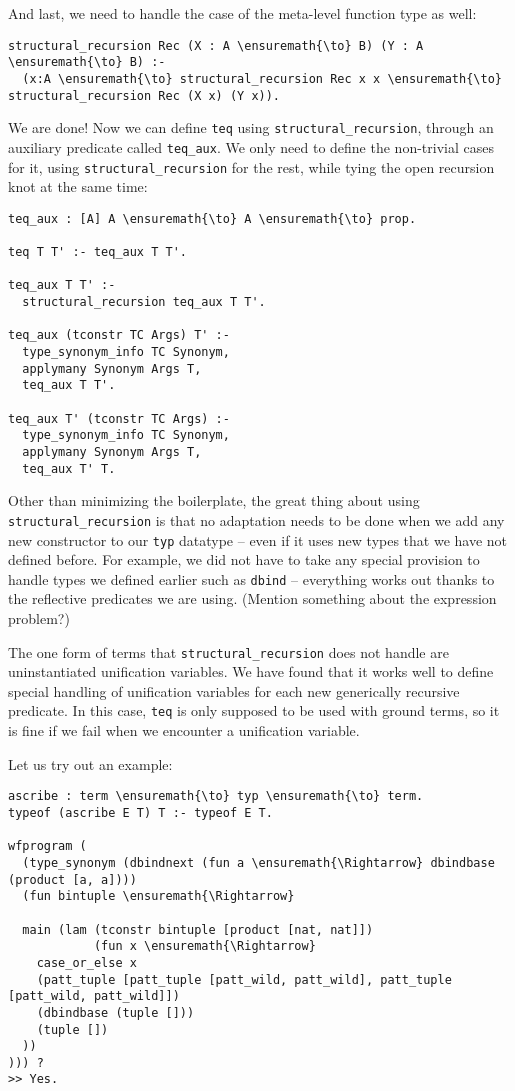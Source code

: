 And last, we need to handle the case of the meta-level function type as
well:

\begin{verbatim}
structural_recursion Rec (X : A \ensuremath{\to} B) (Y : A \ensuremath{\to} B) :-
  (x:A \ensuremath{\to} structural_recursion Rec x x \ensuremath{\to} structural_recursion Rec (X x) (Y x)).
\end{verbatim}

We are done! Now we can define \texttt{teq} using
\texttt{structural\_recursion}, through an auxiliary predicate called
\texttt{teq\_aux}. We only need to define the non-trivial cases for it,
using \texttt{structural\_recursion} for the rest, while tying the open
recursion knot at the same time:

\begin{verbatim}
teq_aux : [A] A \ensuremath{\to} A \ensuremath{\to} prop.

teq T T' :- teq_aux T T'.

teq_aux T T' :-
  structural_recursion teq_aux T T'.

teq_aux (tconstr TC Args) T' :-
  type_synonym_info TC Synonym,
  applymany Synonym Args T,
  teq_aux T T'.

teq_aux T' (tconstr TC Args) :-
  type_synonym_info TC Synonym,
  applymany Synonym Args T,
  teq_aux T' T.
\end{verbatim}

Other than minimizing the boilerplate, the great thing about using
\texttt{structural\_recursion} is that no adaptation needs to be done
when we add any new constructor to our \texttt{typ} datatype -- even if
it uses new types that we have not defined before. For example, we did
not have to take any special provision to handle types we defined
earlier such as \texttt{dbind} -- everything works out thanks to the
reflective predicates we are using. (Mention something about the
expression problem?)

The one form of terms that \texttt{structural\_recursion} does not
handle are uninstantiated unification variables. We have found that it
works well to define special handling of unification variables for each
new generically recursive predicate. In this case, \texttt{teq} is only
supposed to be used with ground terms, so it is fine if we fail when we
encounter a unification variable.

Let us try out an example:

\begin{verbatim}
ascribe : term \ensuremath{\to} typ \ensuremath{\to} term.
typeof (ascribe E T) T :- typeof E T.

wfprogram (
  (type_synonym (dbindnext (fun a \ensuremath{\Rightarrow} dbindbase (product [a, a])))
  (fun bintuple \ensuremath{\Rightarrow} 
  
  main (lam (tconstr bintuple [product [nat, nat]])
            (fun x \ensuremath{\Rightarrow} 
    case_or_else x
    (patt_tuple [patt_tuple [patt_wild, patt_wild], patt_tuple [patt_wild, patt_wild]])
    (dbindbase (tuple []))
    (tuple [])
  ))
))) ?
>> Yes.
\end{verbatim}


